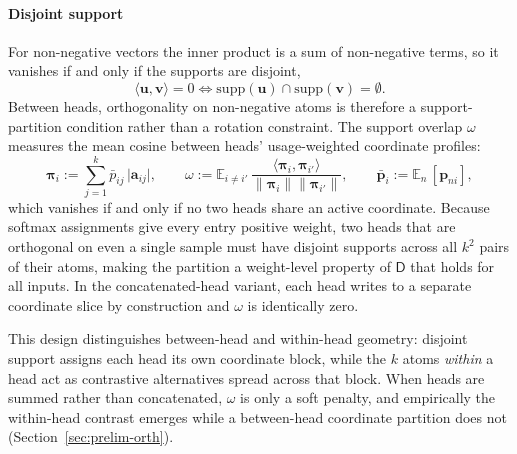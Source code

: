 \paragraph{Disjoint support}
\label{sec:disjoint}
For non-negative vectors the inner product is a sum of non-negative
terms, so it vanishes if and only if the supports are disjoint,
\begin{equation}
	\langle \mathbf{u},\mathbf{v}\rangle = 0
	\iff
	\mathrm{supp}(\mathbf{u}) \cap \mathrm{supp}(\mathbf{v}) = \emptyset .
	\label{eq:disjoint}
\end{equation}
Between heads, orthogonality on non-negative atoms is therefore a
support-partition condition rather than a rotation constraint. The
support overlap $\omega$ measures the mean cosine between heads'
usage-weighted coordinate profiles:
\begin{equation}
	\boldsymbol{\pi}_i := \sum^{k}_{j=1} \bar{p}_{ij}\,
	\lvert \mathbf{a}_{ij}\rvert,
	\qquad
	\omega := \mathbb{E}_{i \neq i'}\,
	\frac{\langle \boldsymbol{\pi}_i, \boldsymbol{\pi}_{i'}\rangle}
	     {\lVert \boldsymbol{\pi}_i\rVert \lVert \boldsymbol{\pi}_{i'}\rVert},
	\qquad
	\bar{\mathbf{p}}_i := \mathbb{E}_{n}\,[\mathbf{p}_{ni}],
	\label{eq:support}
\end{equation}
which vanishes if and only if no two heads share an active coordinate.
Because softmax assignments give every entry positive weight, two heads
that are orthogonal on even a single sample must have disjoint supports
across all $k^2$ pairs of their atoms, making the partition a weight-level
property of $\mathsf{D}$ that holds for all inputs. In the
concatenated-head variant, each head writes to a separate coordinate
slice by construction and $\omega$ is identically zero.

This design distinguishes between-head and within-head geometry: disjoint
support assigns each head its own coordinate block, while the $k$ atoms
\emph{within} a head act as contrastive alternatives spread across that
block. When heads are summed rather than concatenated, $\omega$ is only a
soft penalty, and empirically the within-head contrast emerges while a
between-head coordinate partition does not
(Section~\ref{sec:prelim-orth}).

